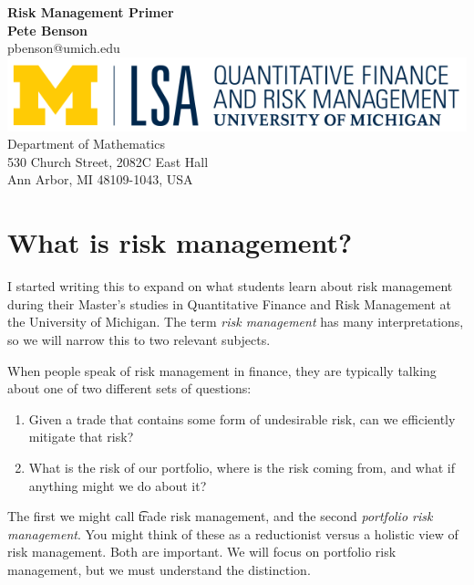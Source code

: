 \documentclass{report}
\numberwithin{problem}{chapter} %
\begin{document}
\begin{titlepage}
\begin{center}
 {\huge\bfseries Risk Management Primer\\}
 \vspace{1.5cm}
 {\bfseries Pete Benson}\\[5pt]
 pbenson@umich.edu\\[14pt]
 \vspace{10cm}
\includegraphics{QFRM_rgb}\\[5pt]
{Department of Mathematics}\\[5pt]
{530 Church Street, 2082C East Hall}\\[5pt]
{Ann Arbor, MI 48109-1043,
 USA}\\
 \vfill

\end{center}
\end{titlepage}


\chapter{What is risk management?}
I started writing this to expand on what students learn about risk management during their Master's studies in   Quantitative Finance and Risk Management at the University of Michigan. The term {\it risk management} has many interpretations, so we will narrow this to two relevant subjects.

When people speak of risk management in finance, they are typically talking about one of two different sets of questions:
\begin{enumerate}
\item{Given a trade that contains some form of undesirable risk,  can we efficiently mitigate that risk?}
\item{What is the risk of our portfolio, where is the risk coming from, and what if anything might we do about it?}
\end{enumerate}
The first we might call {\t trade risk management}, and the second {\it portfolio risk management}. You might think of these as a reductionist versus a holistic view of risk management. Both are important. We will focus on portfolio risk management, but we must understand the distinction. 
\end{document}
